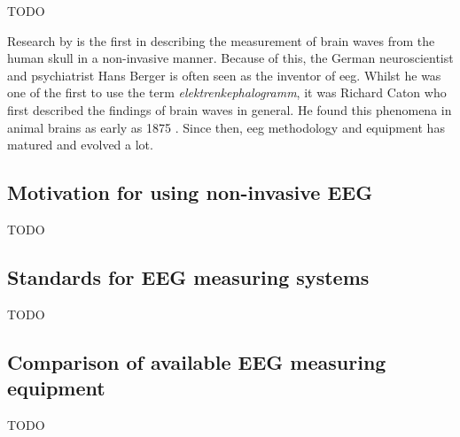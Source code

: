 TODO

Research by \citet{human_eeg_discovery} is the first in describing the measurement of brain waves from the human skull in a non-invasive manner.
Because of this, the German neuroscientist and psychiatrist Hans Berger is often seen as the inventor of \gls{eeg}.
Whilst he was one of the first to use the term \textit{elektrenkephalogramm}, it was Richard Caton who first described the findings of brain waves in general.
He found this phenomena in animal brains as early as 1875 \citep{first_eeg}.
Since then, \gls{eeg} methodology and equipment has matured and evolved a lot.


\subsection{Motivation for using non-invasive EEG}
\label{subsec:biomedical_signals_measuring_why_eeg}


TODO


\subsection{Standards for EEG measuring systems}
\label{subsec:biomedical_signals_measuring_standards}

TODO


\subsection{Comparison of available EEG measuring equipment}
\label{subsec:biomedical_signals_measuring_equipment}

TODO


